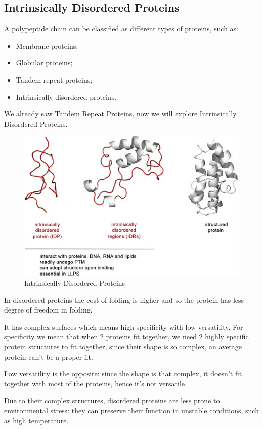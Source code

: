\subsection{Intrinsically Disordered Proteins}
A polypeptide chain can be classified as different types of proteins, such as:
\begin{itemize}
	\item Membrane proteins;
	\item Globular proteins;
	\item Tandem repeat proteins;
	\item Intrinsically disordered proteins.
\end{itemize}
We already saw Tandem Repeat Proteins, now we will explore Intrinsically Disordered Proteins.

\begin{figure}[h!]
	\includegraphics[scale=0.8]{res/proteins_overview/disordered.png}
	\centering
	\caption{Intrinsically Disordered Proteins}
	\label{fig:tandem}
\end{figure}
In disordered proteins the cost of folding is higher and so the protein has less degree of freedom in folding.

It has complex surfaces which means high specificity with low versatility. For specificity we mean that when 2 proteins fit together, we need 2 highly specific protein structures to fit together, since their shape is so complex, an average protein can't be a proper fit.

Low versatility is the opposite: since the shape is that complex, it doesn't fit together with most of the proteins, hence it's not versatile.

Due to their complex structures, disordered proteins are less prone to environmental stress: they can preserve their function in unstable conditions, such as high temperature.

